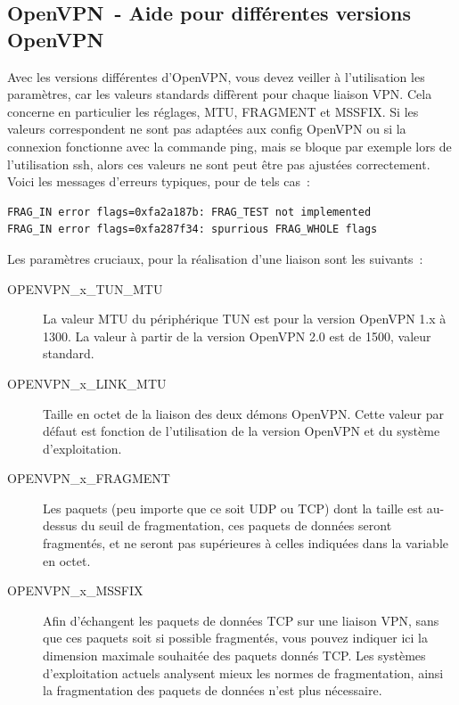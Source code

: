 \subsection{OpenVPN~- Aide pour différentes versions OpenVPN }

Avec les versions différentes d'OpenVPN, vous devez veiller à l'utilisation
les paramètres, car les valeurs standards diffèrent pour chaque liaison VPN.
Cela concerne en particulier les réglages, MTU, FRAGMENT et MSSFIX. Si les
valeurs correspondent ne sont pas \flqq{}adaptées\frqq{} aux config OpenVPN
ou si la connexion fonctionne avec la commande ping, mais se bloque par exemple
lors de l'utilisation ssh, alors ces valeurs ne sont peut être pas ajustées
correctement. Voici les messages d'erreurs typiques, pour de tels cas~:

\begin{example}
\begin{verbatim}
FRAG_IN error flags=0xfa2a187b: FRAG_TEST not implemented
FRAG_IN error flags=0xfa287f34: spurrious FRAG_WHOLE flags
\end{verbatim}
\end{example}

Les paramètres cruciaux, pour la réalisation d'une liaison sont les suivants~:

\begin{description}

\item [OPENVPN\_x\_TUN\_MTU] La valeur MTU du périphérique TUN est pour 
  la version OpenVPN 1.x à 1300. La valeur à partir de la version OpenVPN 2.0
  est de 1500, valeur standard. 

\item [OPENVPN\_x\_LINK\_MTU] Taille en octet de la liaison des deux démons
  OpenVPN. Cette valeur par défaut est fonction de l'utilisation de la version
  OpenVPN et du système d'exploitation.

\item [OPENVPN\_x\_FRAGMENT] Les paquets (peu importe que ce soit UDP ou TCP)
  dont la taille est au-dessus du seuil de fragmentation, ces paquets de données
  seront fragmentés, et ne seront pas supérieures à celles indiquées dans la
  variable  en octet.

\item [OPENVPN\_x\_MSSFIX] Afin d'échangent les paquets de données TCP sur une
  liaison VPN, sans que ces paquets soit si possible fragmentés, vous pouvez
  indiquer ici la dimension maximale souhaitée des paquets donnés TCP. Les
  systèmes d'exploitation actuels analysent mieux les normes de fragmentation,
  ainsi la fragmentation des paquets de données n'est plus nécessaire.

\end{description}

